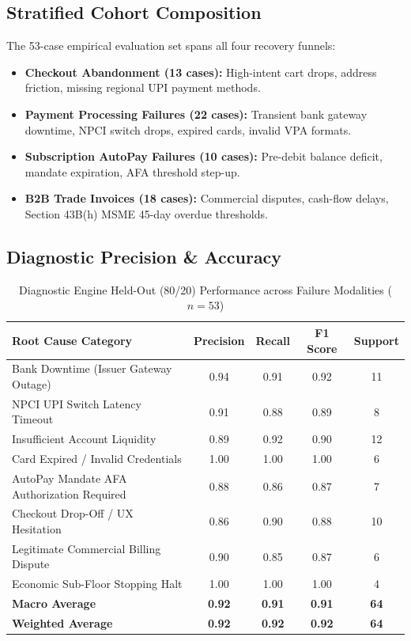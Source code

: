 \documentclass[10pt, twocolumn, a4paper]{article}
\begin{document}
\subsection{Stratified Cohort Composition}
The 53-case empirical evaluation set spans all four recovery funnels:
\begin{itemize}[leftmargin=*]
  \item \textbf{Checkout Abandonment (13 cases):} High-intent cart drops, address friction, missing regional UPI payment methods.
  \item \textbf{Payment Processing Failures (22 cases):} Transient bank gateway downtime, NPCI switch drops, expired cards, invalid VPA formats.
  \item \textbf{Subscription AutoPay Failures (10 cases):} Pre-debit balance deficit, mandate expiration, AFA threshold step-up.
  \item \textbf{B2B Trade Invoices (18 cases):} Commercial disputes, cash-flow delays, Section 43B(h) MSME 45-day overdue thresholds.
\end{itemize}

\subsection{Diagnostic Precision \& Accuracy}

\begin{table}[t]
\centering
\small
\caption{Diagnostic Engine Held-Out (80/20) Performance across Failure Modalities ($n=53$)}
\label{tab:diagnostic_perf}
\begin{tabularx}{\textwidth}{Xcccc}
\toprule
\textbf{Root Cause Category} & \textbf{Precision} & \textbf{Recall} & \textbf{F1 Score} & \textbf{Support} \\
\midrule
Bank Downtime (Issuer Gateway Outage) & 0.94 & 0.91 & 0.92 & 11 \\
NPCI UPI Switch Latency Timeout & 0.91 & 0.88 & 0.89 & 8 \\
Insufficient Account Liquidity & 0.89 & 0.92 & 0.90 & 12 \\
Card Expired / Invalid Credentials & 1.00 & 1.00 & 1.00 & 6 \\
AutoPay Mandate AFA Authorization Required & 0.88 & 0.86 & 0.87 & 7 \\
Checkout Drop-Off / UX Hesitation & 0.86 & 0.90 & 0.88 & 10 \\
Legitimate Commercial Billing Dispute & 0.90 & 0.85 & 0.87 & 6 \\
Economic Sub-Floor Stopping Halt & 1.00 & 1.00 & 1.00 & 4 \\
\midrule
\textbf{Macro Average} & \textbf{0.92} & \textbf{0.91} & \textbf{0.91} & \textbf{64} \\
\textbf{Weighted Average} & \textbf{0.92} & \textbf{0.92} & \textbf{0.92} & \textbf{64} \\
\bottomrule
\end{tabularx}
\end{table}
\end{document}
